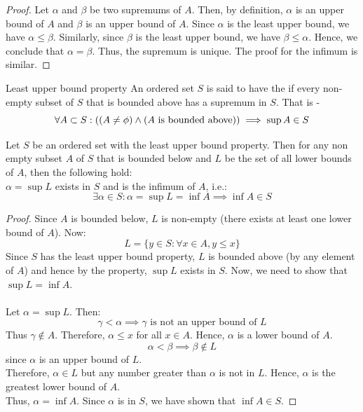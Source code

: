\documentclass[openany]{book}
\begin{document}
\begin{proof}
    Let $\alpha$ and $\beta$ be two supremums of $A$. Then, by definition, $\alpha$ is an upper bound of $A$ and $\beta$ is an upper bound of $A$. Since $\alpha$ is the least upper bound, we have $\alpha \leq \beta$. Similarly, since $\beta$ is the least upper bound, we have $\beta \leq \alpha$. Hence, we conclude that $\alpha = \beta$. Thus, the supremum is unique. The proof for the infimum is similar.
\end{proof}
\begin{mydefinition}{Least upper bound property}
    An ordered set $S$ is said to have the  if every non-empty subset of $S$ that is bounded above has a supremum in $S$. That is - 
    $$\forall A \subset S: ((A \neq \phi) \wedge (A \text{ is bounded above})) \implies \sup A \in S$$
\end{mydefinition}
\begin{mytheorem}
    Let $S$ be an ordered set with the least upper bound property. Then for any non empty subset $A$ of $S$ that is bounded below and $L$ be the set of all lower bounds of $A$, then the following hold: \\ 
    $\alpha = \sup L$ exists in $S$ and is the infimum of $A$, i.e.: 
    $$\exists \alpha \in S: \alpha = \sup L = \inf A \implies \inf A \in S$$
\end{mytheorem}
\begin{proof}
    Since $A$ is bounded below, $L$ is non-empty (there exists at least one lower bound of $A$). Now: 
    $$L = \{y\in S: \forall x \in A, y \leq x\}$$
    Since $S$ has the least upper bound property, $L$ is bounded above (by any element of $A$) and hence by the property, $\sup L$ exists in $S$. Now, we need to show that $\sup L = \inf A$. \\ \\ 
    Let $\alpha = \sup L$. Then: 
    $$\gamma < \alpha \implies \gamma \text{ is not an upper bound of } L$$
    Thus $\gamma \notin A$. Therefore, $\alpha \leq x$ for all $x \in A$. Hence, $\alpha$ is a lower bound of $A$. \\
    $$\alpha < \beta \implies \beta \notin L$$ since $\alpha$ is an upper bound of $L$. \\
    Therefore, $\alpha \in L$ but any number greater than $\alpha$ is not in $L$. Hence, $\alpha$ is the greatest lower bound of $A$. \\
    Thus, $\alpha = \inf A$. Since $\alpha$ is in $S$, we have shown that $\inf A \in S$.
\end{proof}
\end{document}
